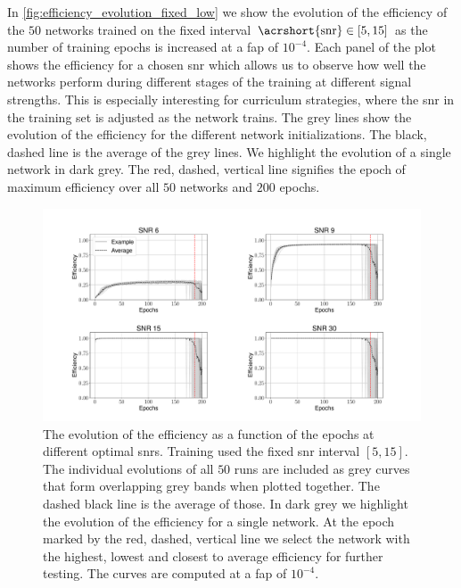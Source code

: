 In \autoref{fig:efficiency_evolution_fixed_low} we show the evolution of the efficiency of the $50$ networks trained on the fixed interval $\text{\acrshort{snr}}\in\left[5,15\right]$ as the number of training epochs is increased at a \acrshort{fap} of $10^{-4}$. Each panel of the plot shows the efficiency for a chosen \acrshort{snr} which allows us to observe how well the networks perform during different stages of the training at different signal strengths. This is especially interesting for curriculum strategies, where the \acrshort{snr} in the training set is adjusted as the network trains. The grey lines show the evolution of the efficiency for the different network initializations. The black, dashed line is the average of the grey lines. We highlight the evolution of a single network in dark grey. The red, dashed, vertical line signifies the epoch of maximum efficiency over all $50$ networks and $200$ epochs. 
\begin{figure}
    \centering
    \includegraphics[width=\textwidth]{chapters/training_strats/images/fixed_low_soft.pdf}
    \caption[Network efficiency evolution fixed low strategy with Softmax]{The evolution of the efficiency as a function of the epochs at different optimal \acrshort{snr}s. Training used the fixed \acrshort{snr} interval $\left[5,15\right]$. The individual evolutions of all $50$ runs are included as grey curves that form overlapping grey bands when plotted together. The dashed black line is the average of those. In dark grey we highlight the evolution of the efficiency for a single network. At the epoch marked by the red, dashed, vertical line we select the network with the highest, lowest and closest to average efficiency for further testing. The curves are computed at a \acrshort{fap} of $10^{-4}$.}
    \label{fig:efficiency_evolution_fixed_low}
\end{figure}

